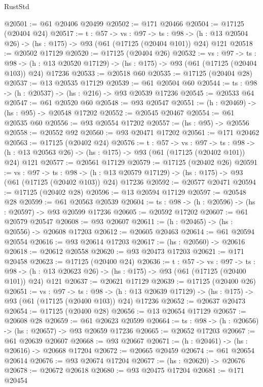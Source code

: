 \begin{lexlean}{RustStd}
\begin{coremodule}
@20501 := @61 @20406 @20499
@20502 := @171 @20466
@20504 := @17125 (@20404 @24)
@20517 := {t : @57} ->
  {vs : @97} ->
  {ts : @98} -> (h : @13 @20504 @26) -> (hs : @175) -> @93 (@61 (@17125 (@20404 @101)) @24) @121
@20518 := @20502 @17129
@20520 := @17125 (@20404 @26)
@20532 := {vs : @97} ->
  {ts : @98} ->
  (h : @13 @20520 @17129) -> (hs : @175) -> @93 (@61 (@17125 (@20404 @103)) @24) @17236
@20533 := @20518 @60
@20535 := @17125 (@20404 @28)
@20537 := @13 @20535 @17129
@20539 := @61 @20504 @60
@20544 := {ts : @98} -> (h : @20537) -> (hs : @216) -> @93 @20539 @17236
@20545 := @20533 @64
@20547 := @61 @20520 @60
@20548 := @93 @20547
@20551 := (h : @20469) -> (hs : @95) -> @20548 @17202
@20552 := @20545 @20467
@20554 := @61 @20535 @60
@20556 := @93 @20554 @17202
@20557 := (hs : @95) -> @20556
@20558 := @20552 @92
@20560 := @93 @20471 @17202
@20561 := @171 @20462
@20563 := @17125 (@20402 @24)
@20576 := {t : @57} ->
  {vs : @97} ->
  {ts : @98} -> (h : @13 @20563 @26) -> (hs : @175) -> @93 (@61 (@17125 (@20402 @101)) @24) @121
@20577 := @20561 @17129
@20579 := @17125 (@20402 @26)
@20591 := {vs : @97} ->
  {ts : @98} ->
  (h : @13 @20579 @17129) -> (hs : @175) -> @93 (@61 (@17125 (@20402 @103)) @24) @17236
@20592 := @20577 @20471
@20594 := @17125 (@20402 @28)
@20596 := @13 @20594 @17129
@20597 := @20548 @28
@20599 := @61 @20563 @20539
@20604 := {ts : @98} -> (h : @20596) -> (hs : @20597) -> @93 @20599 @17236
@20605 := @20592 @17202
@20607 := @61 @20579 @20547
@20608 := @93 @20607
@20611 := (h : @20465) -> (hs : @20556) -> @20608 @17203
@20612 := @20605 @20463
@20614 := @61 @20594 @20554
@20616 := @93 @20614 @17203
@20617 := (hs : @20560) -> @20616
@20618 := @20612 @20558
@20620 := @93 @20473 @17203
@20621 := @171 @20458
@20623 := @17125 (@20400 @24)
@20636 := {t : @57} ->
  {vs : @97} ->
  {ts : @98} -> (h : @13 @20623 @26) -> (hs : @175) -> @93 (@61 (@17125 (@20400 @101)) @24) @121
@20637 := @20621 @17129
@20639 := @17125 (@20400 @26)
@20651 := {vs : @97} ->
  {ts : @98} ->
  (h : @13 @20639 @17129) -> (hs : @175) -> @93 (@61 (@17125 (@20400 @103)) @24) @17236
@20652 := @20637 @20473
@20654 := @17125 (@20400 @28)
@20656 := @13 @20654 @17129
@20657 := @20608 @28
@20659 := @61 @20623 @20599
@20664 := {ts : @98} -> (h : @20656) -> (hs : @20657) -> @93 @20659 @17236
@20665 := @20652 @17203
@20667 := @61 @20639 @20607
@20668 := @93 @20667
@20671 := (h : @20461) -> (hs : @20616) -> @20668 @17204
@20672 := @20665 @20459
@20674 := @61 @20654 @20614
@20676 := @93 @20674 @17204
@20677 := (hs : @20620) -> @20676
@20678 := @20672 @20618
@20680 := @93 @20475 @17204
@20681 := @171 @20454

\end{coremodule}
\end{lexlean}
